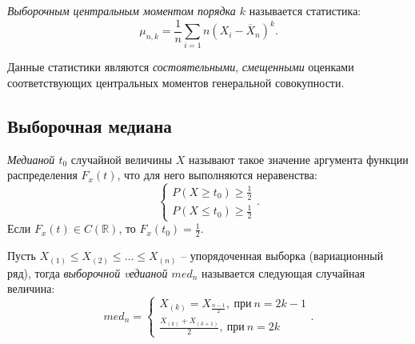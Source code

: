 \begin{definition}
  \textit{Выборочным центральным моментом порядка $k$} называется статистика:
  \[
    \mu_{n, k} = \frac{1}{n} \sum\limits_{i = 1}{n} (X_i - \overline{X}_n)^k
  .\]
\end{definition}

Данные статистики являются \textit{состоятельными}, \textit{смещенными} оценками
соответствующих центральных моментов генеральной совокупности.

\subsection{Выборочная медиана}

\begin{definition}
  \textit{Медианой $t_0$} случайной величины $X$ называют такое значение
  аргумента функции распределения $F_x(t)$, что для него выполняются
  неравенства:
  \[
    \begin{cases}
      P(X \geqslant t_0) \geqslant \frac{1}{2}\\
      P(X \leqslant t_0) \geqslant \frac{1}{2}
    \end{cases}
  .\]
  Если $F_x(t) \in C(\mathbb{R})$, то $F_x(t_0) = \frac{1}{2}$.
\end{definition}

\begin{definition}
  Пусть $X_{(1)} \leqslant X_{(2)} \leqslant \ldots \leqslant X_{(n)}$ --
  упорядоченная выборка (вариационный ряд), тогда \textit{выборочной vедианой
  $med_n$} называется следующая случайная величина:
  \[
    med_n = \begin{cases}
      X_{(k)} = X_{\frac{n - 1}{2}},~ \text{при}~ n = 2k - 1\\
      \frac{X_{(k)} + X_{(k + 1)}}{2},~ \text{при}~ n = 2k
    \end{cases}
  .\]
\end{definition}

